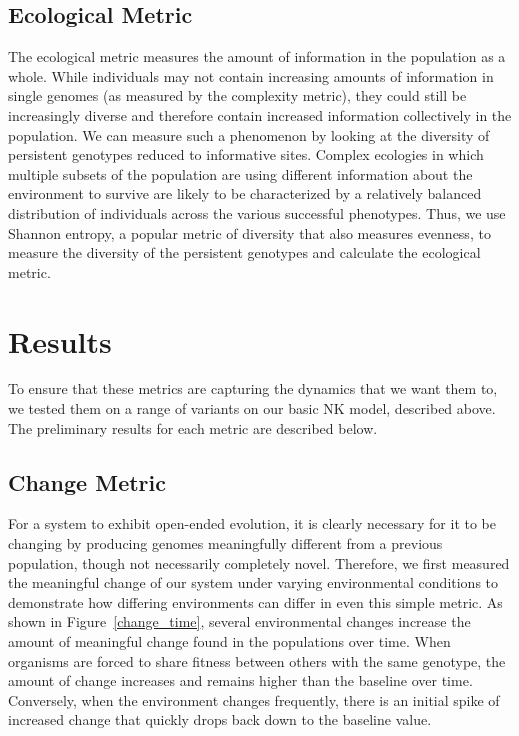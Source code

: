 \documentclass[letterpaper]{article}
\begin{document}
\subsection{Ecological Metric}
    The ecological metric measures the amount of information in the population as a whole. While individuals may not contain increasing amounts of information in single genomes (as measured by the complexity metric), they could still be increasingly diverse and therefore contain increased information collectively in the population. We can measure such a phenomenon by looking at the diversity of persistent genotypes reduced to informative sites. Complex ecologies in which multiple subsets of the population are using different information about the environment to survive are likely to be characterized by a relatively balanced distribution of individuals across the various successful phenotypes. Thus, we use Shannon entropy, a popular metric of diversity that also measures evenness, to measure the diversity of the persistent genotypes and calculate the ecological metric.



\section{Results}
    To ensure that these metrics are capturing the dynamics that we want them to, we tested them on a range of variants on our basic NK model, described above.  The preliminary results for each metric are described below.

\subsection{Change Metric}
For a system to exhibit open-ended evolution, it is clearly necessary for it to be changing by producing genomes meaningfully different from a previous population, though not necessarily completely novel. Therefore, we first measured the meaningful change of our system under varying environmental conditions to demonstrate how differing environments can differ in even this simple metric. As shown in Figure~\ref{change_time}, several environmental changes increase the amount of meaningful change found in the populations over time. When organisms are forced to share fitness between others with the same genotype, the amount of change increases and remains higher than the baseline over time. Conversely, when the environment changes frequently, there is an initial spike of increased change that quickly drops back down to the baseline value.
\end{document}
